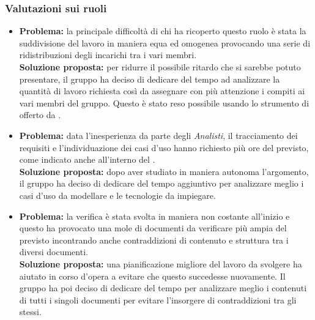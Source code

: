 \subsubsection{Valutazioni sui ruoli}
\begin{itemize}
	\item \textbf{Problema:} la principale difficoltà di chi ha ricoperto questo ruolo è stata la suddivisione del lavoro in maniera equa ed omogenea provocando una serie di ridistribuzioni degli incarichi tra i vari membri.\\
	\textbf{Soluzione proposta:} per ridurre il possibile ritardo che si sarebbe potuto presentare, il gruppo ha deciso di dedicare del tempo ad analizzare la quantità di lavoro richiesta così da assegnare con più attenzione i compiti ai vari membri del gruppo. Questo è stato reso possibile usando lo strumento di  offerto da .
\end{itemize}
\begin{itemize}
	\item \textbf{Problema:} data l'inesperienza da parte degli \textit{Analisti}, il tracciamento dei requisiti e l'individuazione dei casi d'uso hanno richiesto più ore del previsto, come indicato anche all'interno del .\\
	\textbf{Soluzione proposta:} dopo aver studiato in maniera autonoma l'argomento, il gruppo ha deciso di dedicare del tempo aggiuntivo per analizzare meglio i casi d’uso da modellare e le tecnologie da impiegare.
\end{itemize}
\begin{itemize}
	\item \textbf{Problema:} la verifica è stata svolta in maniera non costante all'inizio e questo ha provocato una mole di documenti da verificare più ampia del previsto incontrando anche contraddizioni di contenuto e struttura tra i diversi documenti.\\
	\textbf{Soluzione proposta:} una pianificazione migliore del lavoro da svolgere ha aiutato in corso d’opera a evitare che questo succedesse nuovamente. Il gruppo ha poi deciso di dedicare del tempo per analizzare meglio i contenuti di tutti i singoli documenti per evitare l’insorgere di contraddizioni tra gli stessi.
\end{itemize}
